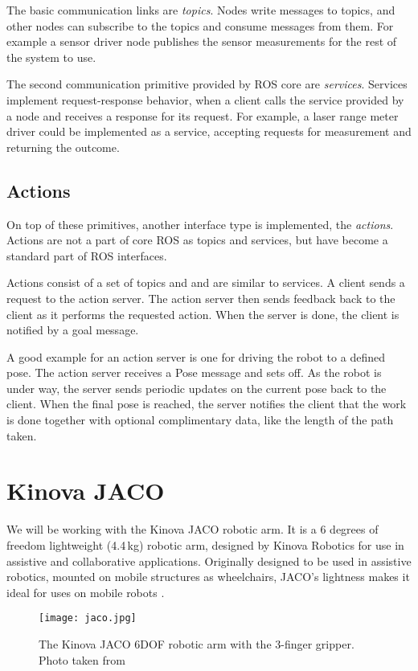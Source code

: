 \documentclass[buriama8_dp.tex]{subfiles}
\begin{document}
The basic communication links are \emph{topics}. Nodes write messages to topics, and other nodes can subscribe to the topics and consume messages from them. For example a sensor driver node publishes the sensor measurements for the rest of the system to use.

The second communication primitive provided by ROS core are \emph{services}. Services implement request-response behavior, when a client calls the service provided by a node and receives a response for its request. For example, a laser range meter driver could be implemented as a service, accepting requests for measurement and returning the outcome.

\subsection{Actions}
\label{subsec:ros_actions}

On top of these primitives, another interface type is implemented, the \emph{actions}. Actions are not a part of core ROS as topics and services, but have become a standard part of ROS interfaces.

Actions consist of a set of topics and and are similar to services. A client sends a request to the action server. The action server then sends feedback back to the client as it performs the requested action. When the server is done, the client is notified by a goal message.

A good example for an action server is one for driving the robot to a defined pose. The action server receives a Pose message and sets off. As the robot is under way, the server sends periodic updates on the current pose back to the client. When the final pose is reached, the server notifies the client that the work is done together with optional complimentary data, like the length of the path taken.


\section{Kinova JACO}
\label{sec:jaco}
We will be working with the Kinova JACO robotic arm. It is a 6 degrees of freedom lightweight (4.4\,kg) robotic arm, designed by Kinova Robotics for use in assistive and collaborative applications. Originally designed to be used in assistive robotics, mounted on mobile structures as wheelchairs, JACO's lightness makes it ideal for uses on mobile robots \cite{kinova}.

\begin{figure}[ht]
  \centering
  \hspace{1cm}\texttt{[image: jaco.jpg]}
  \caption[Kinova JACO]{The Kinova JACO 6DOF robotic arm with the 3-finger gripper. Photo taken from \cite{kinova}}
  \label{fig:jaco}
\end{figure}
\end{document}
